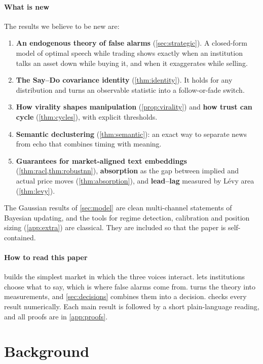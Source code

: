 \documentclass[11pt,a4paper]{article}
\theoremstyle{sci}
\theoremstyle{scidef}
\begin{document}
\paragraph{What is new} The results we believe to be new are:
\begin{enumerate}
  \item \textbf{An endogenous theory of false alarms} (\cref{sec:strategic}). A closed-form model of optimal speech while trading shows exactly when an institution talks an asset down while buying it, and when it exaggerates while selling.
  \item \textbf{The Say--Do covariance identity} (\cref{thm:identity}). It holds for any distribution and turns an observable statistic into a follow-or-fade switch.
  \item \textbf{How virality shapes manipulation} (\cref{prop:virality}) and \textbf{how trust can cycle} (\cref{thm:cycles}), with explicit thresholds.
  \item \textbf{Semantic declustering} (\cref{thm:semantic}): an exact way to separate news from echo that combines timing with meaning.
  \item \textbf{Guarantees for market-aligned text embeddings} (\cref{thm:racl,thm:robustnn}), \textbf{absorption} as the gap between implied and actual price moves (\cref{thm:absorption}), and \textbf{lead--lag} measured by L\'evy area (\cref{thm:levy}).
\end{enumerate}
The Gaussian results of \cref{sec:model} are clean multi-channel statements of Bayesian updating, and the tools for regime detection, calibration and position sizing (\cref{app:extra}) are classical. They are included so that the paper is self-contained.

\paragraph{How to read this paper}  builds the simplest market in which the three voices interact.  lets institutions choose what to say, which is where false alarms come from.  turns the theory into measurements, and \cref{sec:decisions} combines them into a decision.  checks every result numerically. Each main result is followed by a short plain-language reading, and all proofs are in \cref{app:proofs}.

\section{Background}\label{sec:related}
\end{document}
